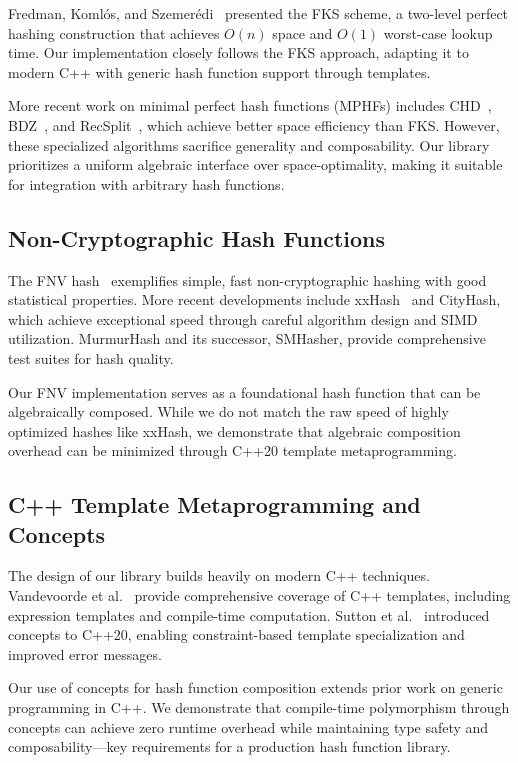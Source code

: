 \documentclass[11pt,a4paper]{article}
\theoremstyle{definition}
\begin{document}
Fredman, Komlós, and Szemerédi~\cite{perfect} presented the FKS scheme, a two-level perfect hashing construction that achieves $O(n)$ space and $O(1)$ worst-case lookup time. Our implementation closely follows the FKS approach, adapting it to modern C++ with generic hash function support through templates.

More recent work on minimal perfect hash functions (MPHFs) includes CHD~\cite{chd}, BDZ~\cite{bdz}, and RecSplit~\cite{recsplit}, which achieve better space efficiency than FKS. However, these specialized algorithms sacrifice generality and composability. Our library prioritizes a uniform algebraic interface over space-optimality, making it suitable for integration with arbitrary hash functions.

\subsection{Non-Cryptographic Hash Functions}

The FNV hash~\cite{fnv} exemplifies simple, fast non-cryptographic hashing with good statistical properties. More recent developments include xxHash~\cite{xxhash} and CityHash, which achieve exceptional speed through careful algorithm design and SIMD utilization. MurmurHash and its successor, SMHasher, provide comprehensive test suites for hash quality.

Our FNV implementation serves as a foundational hash function that can be algebraically composed. While we do not match the raw speed of highly optimized hashes like xxHash, we demonstrate that algebraic composition overhead can be minimized through C++20 template metaprogramming.

\subsection{C++ Template Metaprogramming and Concepts}

The design of our library builds heavily on modern C++ techniques. Vandevoorde et al.~\cite{template} provide comprehensive coverage of C++ templates, including expression templates and compile-time computation. Sutton et al.~\cite{concepts} introduced concepts to C++20, enabling constraint-based template specialization and improved error messages.

Our use of concepts for hash function composition extends prior work on generic programming in C++. We demonstrate that compile-time polymorphism through concepts can achieve zero runtime overhead while maintaining type safety and composability—key requirements for a production hash function library.
\end{document}
